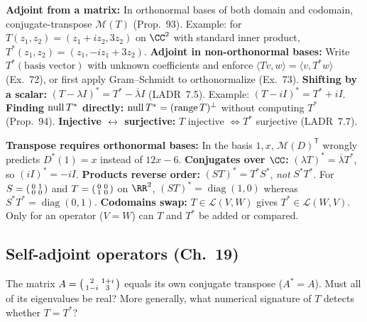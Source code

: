 \documentclass[10pt]{scrartcl}
\newcommand{\LL}{\mathcal L}\newcommand{\PP}{\mathcal P}\newcommand{\MM}{\mathcal M}
\begin{document}
\begin{shortcuts}
  \ii \textbf{Adjoint from a matrix:} In orthonormal bases of both domain and codomain, conjugate-transpose $\MM(T)$ (Prop.~93). Example: for $T(z_1,z_2)=(z_1+iz_2,3z_2)$ on $\CC^2$ with standard inner product, $T^*(z_1,z_2)=(z_1,-iz_1+3z_2)$.
  \ii \textbf{Adjoint in non-orthonormal bases:} Write $T^*(\text{basis vector})$ with unknown coefficients and enforce $\langle Tv,w\rangle=\langle v,T^*w\rangle$ (Ex.~72), or first apply Gram--Schmidt to orthonormalize (Ex.~73).
  \ii \textbf{Shifting by a scalar:} $(T-\lambda I)^* = T^* - \overline{\lambda}I$ (LADR~7.5). Example: $(T-iI)^*=T^*+iI$.
  \ii \textbf{Finding $\operatorname{null} T^*$ directly:} $\operatorname{null} T^* = (\operatorname{range} T)^\perp$ without computing $T^*$ (Prop.~94).
  \ii \textbf{Injective $\leftrightarrow$ surjective:} $T$ injective $\iff T^*$ surjective (LADR~7.7).
\end{shortcuts}

\begin{trapbox}
  \ii \textbf{Transpose requires orthonormal bases:} In the basis $1,x$, $\MM(D)^{\mathsf T}$ wrongly predicts $D^*(1)=x$ instead of $12x-6$.
  \ii \textbf{Conjugates over $\CC$:} $(\lambda T)^*=\overline{\lambda}T^*$, so $(iI)^* = -iI$.
  \ii \textbf{Products reverse order:} $(ST)^*=T^*S^*$, \emph{not} $S^*T^*$. For $S=\begin{psmallmatrix}0&1\\0&0\end{psmallmatrix}$ and $T=\begin{psmallmatrix}0&0\\1&0\end{psmallmatrix}$ on $\RR^2$, $(ST)^*=\operatorname{diag}(1,0)$ whereas $S^*T^*=\operatorname{diag}(0,1)$.
  \ii \textbf{Codomains swap:} $T\in\LL(V,W)$ gives $T^*\in\LL(W,V)$. Only for an operator ($V=W$) can $T$ and $T^*$ be added or compared.
\end{trapbox}

\subsection{Self-adjoint operators (Ch.~19)}

\begin{qbox}
  The matrix $A=\begin{psmallmatrix}2&1+i\\1-i&3\end{psmallmatrix}$ equals its own conjugate transpose ($A^*=A$). Must all of its eigenvalues be real? More generally, what numerical signature of $T$ detects whether $T=T^*$?
\end{qbox}
\end{document}
